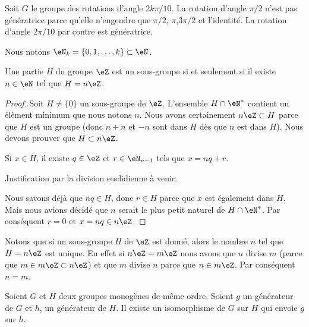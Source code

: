 \begin{example}
    Soit \( G\) le groupe des rotations d'angle \( 2k\pi/10\). La rotation d'angle \( \pi/2\) n'est pas génératrice parce qu'elle n'engendre que \( \pi/2\), \( \pi\),\( 3\pi/2\) et l'identité. La rotation d'angle \( 2\pi/10\) par contre est génératrice.
\end{example}


Nous notons \( \eN_{k}=\{ 0,1,\ldots, k \}\subset\eN\).
 
\begin{proposition} \label{PropSsgpZestnZ}
    Une partie \( H\) du groupe \( \eZ\) est un sous-groupe si et seulement si il existe \( n\in\eN\) tel que \( H=n\eZ\).
\end{proposition}

\begin{proof}
    Soit \( H\neq\{ 0 \}\) un sous-groupe de \( \eZ\). L'ensemble \( H\cap\eN^*\) contient un élément minimum que nous notons \( n\). Nous avons certainement \( n\eZ\subset H\) parce que \( H\) est un groupe (donc \( n+n\) et \( -n\) sont dans \( H\) dès que \( n\) est dans \( H\)). Nous devons prouver que \( H\subset n\eZ\).

    Si \( x\in H\), il existe \( q\in\eZ\) et \( r\in\eN_{n-1}\) tels que \( x=nq+r\).

    \begin{probleme}
        Justification par la division euclidienne à venir.
    \end{probleme}
    Nous savons déjà que \( nq\in H\), donc \( r\in H\) parce que \( x\) est également dans \( H\). Mais nous avions décidé que \( n\) serait le plus petit naturel de \( H\cap\eN^*\). Par conséquent \( r=0\) et \( x=nq\in n\eZ\).

\end{proof}

Notons que si un sous-groupe \( H\) de \( \eZ\) est donné, alors le nombre \( n\) tel que \( H=n\eZ\) est unique. En effet si \( n\eZ=m\eZ\) nous avons que \( n\) divise \( m\) (parce que \( m\in m\eZ\subset n\eZ\)) et que \( m\) divise \( n\) parce que \( n\in m\eZ\). Par conséquent \( n=m\).

\begin{lemma}   \label{LemZhxMit}
    Soient \( G\) et \( H\) deux groupes monogènes de même ordre. Soient \( g\) un générateur de \( G\) et \( h\), un générateur de \( H\). Il existe un isomorphisme de \( G\) sur \( H\) qui envoie \( g\) sur \( h\).
\end{lemma}

